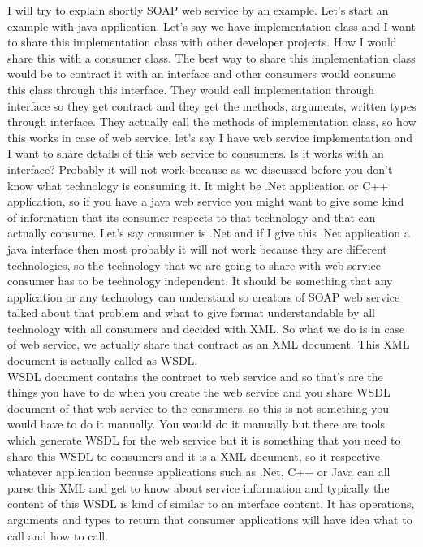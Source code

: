 I will try to explain shortly SOAP web service by an example. Let’s start an example with java application. Let’s say we have
implementation class and I want to share this implementation class with other developer projects. How I would share this with a
consumer class. The best way to share this implementation class would be to contract it with an interface and other consumers
would consume this class through this interface. They would call implementation through interface so they get contract and they
get the methods, arguments, written types through interface. They actually call the methods of implementation class, so how this
works in case of web service, let’s say I have web service implementation and I want to share details of this web service to
consumers. Is it works with an interface? Probably it will not work because as we discussed before you don’t know what technology
is consuming it. It might be .Net application or C++ application, so if you have a java web service you might want to give some
kind of information that its consumer respects to that technology and that can actually consume. Let’s say consumer is .Net and if I give this .Net
application a java interface then most probably it will not work because they are different technologies, so the technology
that we are going to share with web service consumer has to be technology independent. It should be something that any
application or any technology can understand so creators of SOAP web service talked about that problem and what to give format
understandable by all technology with all consumers and decided with XML. So what we do is in case of web service, we
actually share that contract as an XML document. This XML document is actually called as WSDL.\\

WSDL document contains the contract to web service and so that’s are the things you have to do when you create the web
service and you share WSDL document of that web service to the consumers, so this is not something you would have to do
it manually. You would do it manually but there are tools which generate WSDL for the web service but it is something that
you need to share this WSDL to consumers and it is a XML document, so it respective whatever application because applications
such as .Net, C++ or Java can all parse this XML and get to know about service information and typically the content of
this WSDL is kind of similar to an interface content. It has operations, arguments and types  to return that consumer
applications will have idea what to call and how to call.\\

